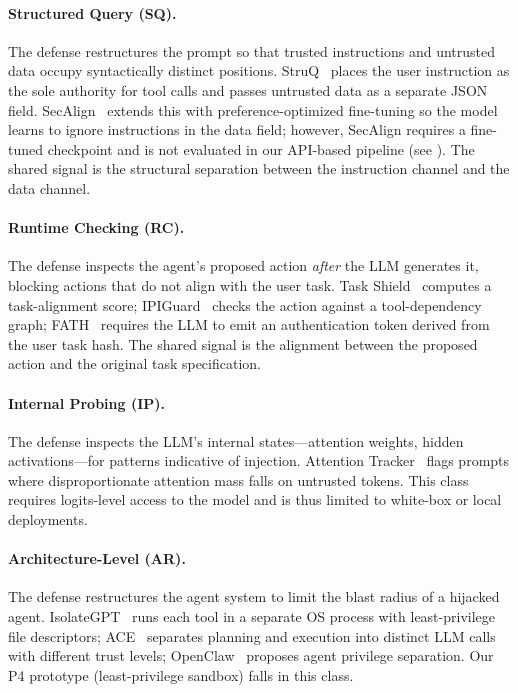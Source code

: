 \paragraph{Structured Query (SQ).}
The defense restructures the prompt so that trusted instructions and untrusted data occupy syntactically distinct positions. StruQ~\cite{chen2024struq} places the user instruction as the sole authority for tool calls and passes untrusted data as a separate JSON field. SecAlign~\cite{chen2024secalign} extends this with preference-optimized fine-tuning so the model learns to ignore instructions in the data field; however, SecAlign requires a fine-tuned checkpoint and is not evaluated in our API-based pipeline (see ). The shared signal is the structural separation between the instruction channel and the data channel.

\paragraph{Runtime Checking (RC).}
The defense inspects the agent's proposed action \emph{after} the LLM generates it, blocking actions that do not align with the user task. Task Shield~\cite{jia2025task} computes a task-alignment score; IPIGuard~\cite{an2025ipiguard} checks the action against a tool-dependency graph; FATH~\cite{wang2024fath} requires the LLM to emit an authentication token derived from the user task hash. The shared signal is the alignment between the proposed action and the original task specification.

\paragraph{Internal Probing (IP).}
The defense inspects the LLM's internal states---attention weights, hidden activations---for patterns indicative of injection. Attention Tracker~\cite{hung2025attention} flags prompts where disproportionate attention mass falls on untrusted tokens. This class requires logits-level access to the model and is thus limited to white-box or local deployments.

\paragraph{Architecture-Level (AR).}
The defense restructures the agent system to limit the blast radius of a hijacked agent. IsolateGPT~\cite{wu2025isolategpt} runs each tool in a separate OS process with least-privilege file descriptors; ACE~\cite{li2025security} separates planning and execution into distinct LLM calls with different trust levels; OpenClaw~\cite{cheng2026agent} proposes agent privilege separation. Our P4 prototype (least-privilege sandbox) falls in this class.

